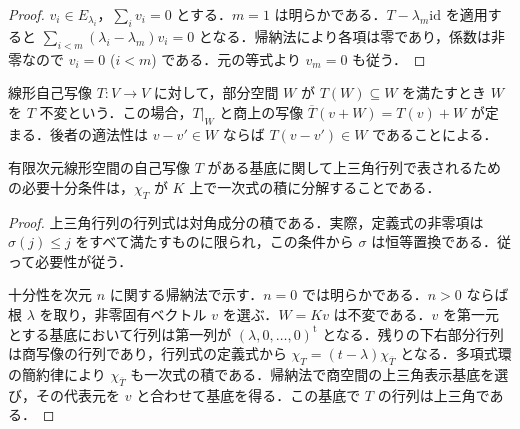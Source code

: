 \begin{proof}
$v_i\in E_{\lambda_i}$，$\sum_i v_i=0$ とする．$m=1$ は明らかである．$T-\lambda_m\mathrm{id}$ を適用すると $\sum_{i<m}(\lambda_i-\lambda_m)v_i=0$ となる．帰納法により各項は零であり，係数は非零なので $v_i=0$ ($i<m$) である．元の等式より $v_m=0$ も従う．
\end{proof}
\begin{defn}[不変部分空間]
線形自己写像 $T:V\to V$ に対して，部分空間 $W$ が $T(W)\subseteq W$ を満たすとき $W$ を $T$ 不変という．この場合，$T|_W$ と商上の写像 $\overline T(v+W)=T(v)+W$ が定まる．後者の適法性は $v-v'\in W$ ならば $T(v-v')\in W$ であることによる．
\end{defn}
\begin{prop}[三角化可能性の判定]
有限次元線形空間の自己写像 $T$ がある基底に関して上三角行列で表されるための必要十分条件は，$\chi_T$ が $K$ 上で一次式の積に分解することである．
\end{prop}
\begin{proof}
上三角行列の行列式は対角成分の積である．実際，定義式の非零項は $\sigma(j)\leq j$ をすべて満たすものに限られ，この条件から $\sigma$ は恒等置換である．従って必要性が従う．

十分性を次元 $n$ に関する帰納法で示す．$n=0$ では明らかである．$n>0$ ならば根 $\lambda$ を取り，非零固有ベクトル $v$ を選ぶ．$W=Kv$ は不変である．$v$ を第一元とする基底において行列は第一列が $(\lambda,0,\ldots,0)^{\mathrm t}$ となる．残りの下右部分行列は商写像の行列であり，行列式の定義式から $\chi_T=(t-\lambda)\chi_{\overline T}$ となる．多項式環の簡約律により $\chi_{\overline T}$ も一次式の積である．帰納法で商空間の上三角表示基底を選び，その代表元を $v$ と合わせて基底を得る．この基底で $T$ の行列は上三角である．
\end{proof}
